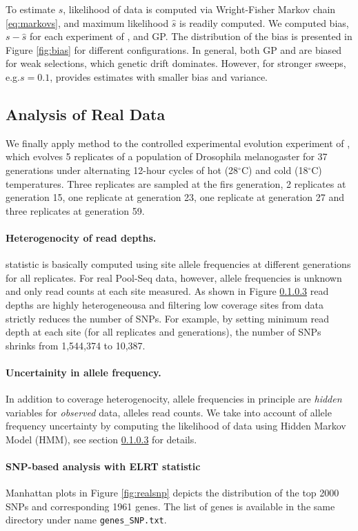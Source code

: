 \documentclass[11pt]{article}
\def\comale{\text{COMALE }}
\begin{document}
To estimate $s$, likelihood of data is computed via Wright-Fisher Markov chain 
\eqref{eq:markovs}, and maximum likelihood $\hat{s}$ is readily computed.
We computed bias, $s-\hat{s}$ for each 
experiment of \comale, and GP. The distribution of the bias is presented in 
Figure 
\ref{fig:bias} for different configurations. In general, both GP and  \comale 
are 
biased for weak selections, which genetic drift dominates. However, for 
stronger sweeps, e.g.$s=0.1$, \comale provides estimates with smaller bias and 
variance.

\subsection{Analysis of Real Data}
We finally apply \comale method to the controlled experimental evolution 
experiment 
of \cite{orozco2012adaptation}, which evolves 5 replicates of a population of 
Drosophila melanogaster for 37 generations under alternating 12-hour cycles of 
hot (28$^{\circ}$C) and cold (18$^{\circ}$C) temperatures. Three replicates are 
sampled at the firs generation, 2 replicates at generation 15, one replicate at 
generation 23, one replicate at generation 27 and three replicates at 
generation 59.
\paragraph{Heterogenocity of read depths.} \comale statistic is basically 
computed using site allele frequencies at different generations for all 
replicates. For real Pool-Seq data, however, allele frequencies is unknown and 
only read counts at each site measured. As shown in Figure \ref{} read depths 
are highly heterogeneousa and filtering low coverage sites from data strictly 
reduces the number of SNPs. For example, by setting minimum read depth at 
each site (for all replicates and generations), the number of SNPs shrinks from 
1,544,374 to 10,387. 

\paragraph{Uncertainity in allele frequency.} In addition to coverage 
heterogenocity, 
allele frequencies in principle are 
\emph{hidden} variables for \emph{observed} data, alleles read counts. We 
take into account of allele frequency uncertainty by computing the likelihood 
of data using Hidden Markov Model (HMM), see section \ref{} for details.

\paragraph{SNP-based analysis with ELRT statistic}
Manhattan plots in Figure \ref{fig:realsnp} depicts the distribution of the top 2000 SNPs and corresponding 1961 genes. The list of genes is available in the same directory under name \texttt{genes\_SNP.txt}.
\end{document}
